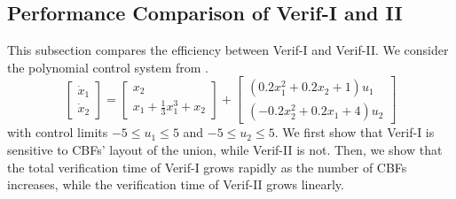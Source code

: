 \documentclass[letterpaper, 10 pt, conference]{ieeeconf}  %
\begin{document}


\subsection{Performance Comparison of Verif-I and II} 

This subsection compares the efficiency between Verif-I and Verif-II. We consider the polynomial control system from \cite{wang2024safe}.
\begin{equation*}
\label{eq:polynomial_system}
    \begin{bmatrix}
        \dot{x}_1\\
        \dot{x}_2
    \end{bmatrix} = 
    \begin{bmatrix}
        x_2\\
        x_1 + \frac{1}{3}x_1^3 + x_2
    \end{bmatrix} + 
    \begin{bmatrix}
        (0.2x_1^2 + 0.2x_2 + 1)u_1\\
        (-0.2x_2^2 + 0.2x_1+4)u_2
    \end{bmatrix}
\end{equation*}
with control limits $-5\leq u_1 \leq 5$ and $-5\leq u_2 \leq 5$. We first show that Verif-I is sensitive to CBFs' layout of the union, while Verif-II is not. Then, we show that the total verification time of Verif-I grows rapidly as the number of CBFs increases, while the verification time of Verif-II grows linearly. 
\end{document}
